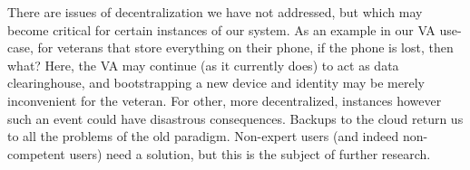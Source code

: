 %
%
%

There are issues of decentralization we have not addressed, but which may become critical for certain instances of our system.
As an example in our VA use-case, for veterans that store everything on their phone, if the phone is lost, then what?
Here, the VA may continue (as it currently does) to act as data clearinghouse, and bootstrapping a new device and identity may be merely inconvenient for the veteran.
For other, more decentralized, instances however such an event could have disastrous consequences.
Backups to the cloud return us to all the problems of the old paradigm.
Non-expert users (and indeed non-competent users) need a solution, but this is the subject of further research.